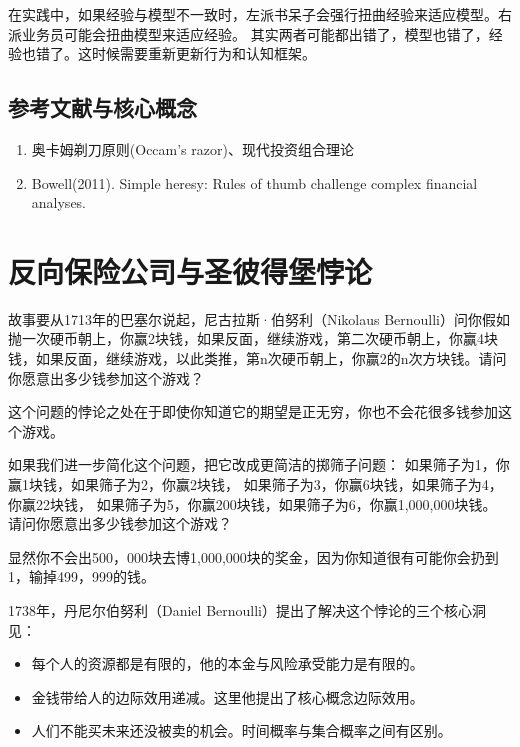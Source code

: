 \documentclass[
  oneside]{book}
\providecommand{\tightlist}{%
  \setlength{\itemsep}{0pt}\setlength{\parskip}{0pt}}
\begin{document}
在实践中，如果经验与模型不一致时，左派书呆子会强行扭曲经验来适应模型。右派业务员可能会扭曲模型来适应经验。
其实两者可能都出错了，模型也错了，经验也错了。这时候需要重新更新行为和认知框架。

\hypertarget{ux53c2ux8003ux6587ux732eux4e0eux6838ux5fc3ux6982ux5ff5}{%
\section{参考文献与核心概念}\label{ux53c2ux8003ux6587ux732eux4e0eux6838ux5fc3ux6982ux5ff5}}

\begin{enumerate}
\def\labelenumi{\arabic{enumi}.}
\tightlist
\item
  奥卡姆剃刀原则(Occam's razor)、现代投资组合理论
\item
  Bowell(2011). Simple heresy: Rules of thumb challenge complex financial analyses.
\end{enumerate}

\hypertarget{ux53cdux5411ux4fddux9669ux516cux53f8ux4e0eux5723ux5f7cux5f97ux5821ux6096ux8bba}{%
\chapter{反向保险公司与圣彼得堡悖论}\label{ux53cdux5411ux4fddux9669ux516cux53f8ux4e0eux5723ux5f7cux5f97ux5821ux6096ux8bba}}

故事要从1713年的巴塞尔说起，尼古拉斯·伯努利（Nikolaus Bernoulli）问你假如抛一次硬币朝上，你赢2块钱，如果反面，继续游戏，第二次硬币朝上，你赢4块钱，如果反面，继续游戏，以此类推，第n次硬币朝上，你赢2的n次方块钱。请问你愿意出多少钱参加这个游戏？

这个问题的悖论之处在于即使你知道它的期望是正无穷，你也不会花很多钱参加这个游戏。

如果我们进一步简化这个问题，把它改成更简洁的掷筛子问题：
如果筛子为1，你赢1块钱，如果筛子为2，你赢2块钱，
如果筛子为3，你赢6块钱，如果筛子为4，你赢22块钱，
如果筛子为5，你赢200块钱，如果筛子为6，你赢1,000,000块钱。
请问你愿意出多少钱参加这个游戏？

显然你不会出500，000块去博1,000,000块的奖金，因为你知道很有可能你会扔到1，输掉499，999的钱。

1738年，丹尼尔伯努利（Daniel Bernoulli）提出了解决这个悖论的三个核心洞见：

\begin{itemize}
\tightlist
\item
  每个人的资源都是有限的，他的本金与风险承受能力是有限的。
\item
  金钱带给人的边际效用递减。这里他提出了核心概念边际效用。
\item
  人们不能买未来还没被卖的机会。时间概率与集合概率之间有区别。
\end{itemize}
\end{document}
